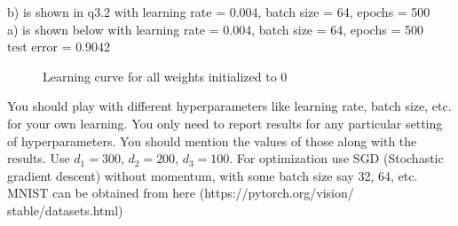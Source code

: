 \documentclass[10pt]{article}
\theoremstyle{definition}
\newenvironment{soln}{
    \leavevmode\color{blue}\ignorespaces
}{}
\begin{document}
\begin{enumerate}
          \begin{soln}
            b) is shown in q3.2 with learning rate = 0.004, batch size = 64, epochs = 500 \\
            a) is shown below with learning rate = 0.004, batch size = 64, epochs = 500 \\
            test error = 0.9042 \\
            \begin{figure}[H]
                \centering  %
                \caption{Learning curve for all weights initialized to 0}
                \label{Fig3.main}
              \end{figure}
          \end{soln}
\end{enumerate}

You should play with different hyperparameters like learning rate, batch size, etc. for your own learning. You only need to report results for any particular setting of hyperparameters. You should mention the values of those along with the results. Use $d_1 = 300$, $d_2 = 200$, $d_3 = 100$. For optimization use SGD (Stochastic gradient descent) without momentum, with some batch size say 32, 64, etc. MNIST can be obtained from here (https://pytorch.org/vision/ stable/datasets.html)


\end{document}
